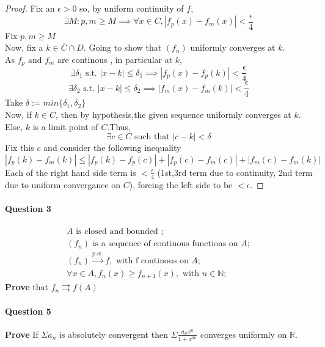 \documentclass[20pt,a4paper]{extarticle} %
\begin{document}
\begin{proof}
	Fix an $\epsilon > 0$ so, by uniform continuity of $f$,
	\[ \exists M: p,m \geq M \implies \forall x \in C, |f_p(x) - f_m(x)| < \frac{\epsilon}{4} \]
	Fix $p,m \geq M$ \\
	Now, fix a  $k \in \overline{C} \cap D$. Going to show that $(f_n)$ uniformly converges at $k$.\\
	As $f_p \text{ and } f_m$ are continous , in particular at $k$,
	\[ \exists \delta_1 \text{ s.t. } |x-k|\leq \delta_1 \implies |f_p(x)-f_p(k)|<\frac{\epsilon}{4}\]
	\[ \exists \delta_2 \text{ s.t. } |x-k|\leq \delta_2 \implies |f_m(x)-f_m(k)|<\frac{\epsilon}{4}\]
	Take $\delta:=min\{\delta_1,\delta_2\}$ \\
		Now, if $k \in C$, then by hypothesis,the given sequence uniformly converges at $k$.
		Else, $k$ is a limit point of $C$.Thus,
		\[ \exists c \in C \text{ such that } |c-k|< \delta \]
		Fix this $c$ and consider the following inequality
	\[|f_p(k)-f_m(k)| \leq |f_p(k)-f_p(c)|+ |f_p(c)-f_m(c)|+ |f_m(c)-f_m(k)|\]
	Each of the right hand side term is $< \frac{\epsilon}{4} $
	(1st,3rd term due to continuity, 2nd term due to uniform convergance on $C$), forcing the left side to be $<\epsilon$.
\end{proof}

\pagebreak
\paragraph{Question 3}
\begin{eqnarray*}
	A \text{ is closed and bounded }; \\
	(f_n) \text{ is a sequence of continous functions on }A; \\
	(f_n) \xrightarrow{p.w.} f, \text{ with f continous on }A; \\
	\forall x \in A, f_n(x) \geq f_{n+1}(x), \text{ with } n \in \mathbb{N};
\end{eqnarray*}
\textbf{Prove} that $f_n \rightrightarrows f(A)$ \\

\paragraph{Question 5}
\textbf{Prove} If $\Sigma a_n$ is absolutely convergent then $\Sigma \frac{a_n x^n}{1+x^{2n}}$ converges uniformly on $\mathbb{R}.$
\end{document}
